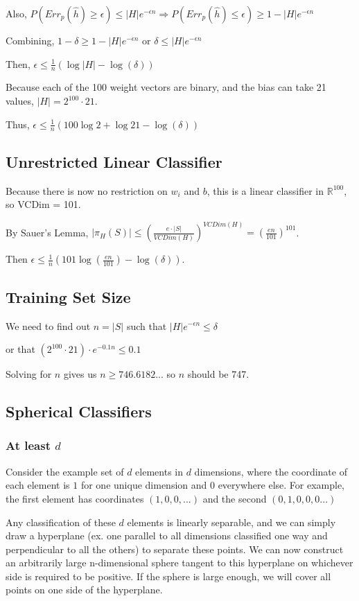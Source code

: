 \documentclass[]{article}
\begin{document}
Also, $P(Err_p(\hat h) \ge \epsilon) \le |H|e^{-\epsilon n} \Rightarrow P(Err_p(\hat h) \le \epsilon) \ge 1 - |H|e^{-\epsilon n}$

Combining, $1-\delta \ge 1 - |H|e^{-\epsilon n}$ or $\delta \le |H|e^{-\epsilon n}$

Then, $\epsilon \le \frac{1}{n}(\log |H| - \log (\delta))$

Because each of the 100 weight vectors are binary, and the bias can take 21 values, $|H| = 2^{100} \cdot 21$.

Thus, $\epsilon \le \frac{1}{n} (100 \log 2 + \log 21 - \log(\delta))$

\subsection{Unrestricted Linear Classifier}
Because there is now no restriction on $w_i$ and $b$, this is a linear classifier in $\mathbb{R}^{100}$, so VCDim = 101.

By Sauer's Lemma, $|\pi_H(S)| \le (\frac{e\cdot |S|}{VCDim(H)})^{VCDim(H)} = (\frac{en}{101})^{101}$.

Then $\epsilon \le \frac{1}{n}(101\log(\frac{en}{101}) - \log(\delta))$.

\subsection{Training Set Size}

We need to find out $n=|S|$ such that $|H|e^{-\epsilon n} \le \delta$

or that $(2^{100} \cdot 21)\cdot e^{-0.1n} \le 0.1$

Solving for $n$ gives us $n \ge 746.6182...$ so $n$ should be 747.

\subsection{Spherical Classifiers}

\subsubsection{At least $d$}
Consider the example set of $d$ elements in $d$ dimensions, where the coordinate of each element is $1$ for one unique dimension and $0$ everywhere else. For example, the first element has coordinates $(1,0,0,...)$ and the second $(0,1,0,0,0...)$

Any classification of these $d$ elements is linearly separable, and we can simply draw a hyperplane (ex. one parallel to all dimensions classified one way and perpendicular to all the others) to separate these points. We can now construct an arbitrarily large n-dimensional sphere tangent to this hyperplane on whichever side is required to be positive. If the sphere is large enough, we will cover all points on one side of the hyperplane.
\end{document}
